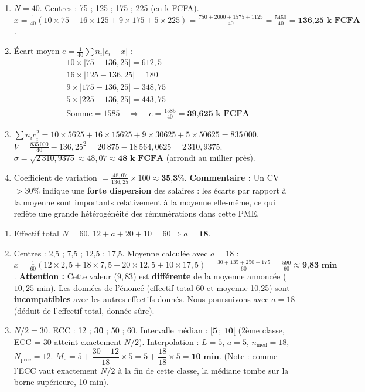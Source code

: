 \documentclass[11pt]{article}
\begin{document}
\begin{corrige}
\begin{enumerate}
\item $N=40$. Centres : 75 ; 125 ; 175 ; 225 (en k FCFA).
$\bar{x} = \frac{1}{40}(10\times75 + 16\times125 + 9\times175 + 5\times225) = \frac{750+2000+1575+1125}{40} = \frac{5450}{40} = \textbf{136,25 k FCFA}$.
\item Écart moyen $e = \frac{1}{40}\sum n_i|c_i-\bar{x}|$ :
\begin{align*}
&10\times|75-136,25| = 612,5 \\
&16\times|125-136,25| = 180 \\
&9\times|175-136,25| = 348,75 \\
&5\times|225-136,25| = 443,75 \\
&\text{Somme} = 1585 \quad\Rightarrow\quad e = \frac{1585}{40} = \textbf{39,625 k FCFA}
\end{align*}
\item $\sum n_i c_i^2 = 10\times5625 + 16\times15625 + 9\times30625 + 5\times50625 = 835\,000$.
$V = \frac{835\,000}{40} - 136,25^2 = 20\,875 - 18\,564,0625 = 2\,310,9375$.
$\sigma = \sqrt{2\,310,9375} \approx 48,07 \approx \textbf{48 k FCFA}$ (arrondi au millier près).
\item Coefficient de variation $= \frac{48,07}{136,25}\times 100 \approx \textbf{35,3\%}$.
\textbf{Commentaire :} Un CV $> 30\%$ indique une \textbf{forte dispersion} des salaires : les écarts par rapport à la moyenne sont importants relativement à la moyenne elle-même, ce qui reflète une grande hétérogénéité des rémunérations dans cette PME.
\end{enumerate}
\end{corrige}

\begin{corrige}
\begin{enumerate}
\item Effectif total $N=60$. $12 + a + 20 + 10 = 60 \Rightarrow a = \textbf{18}$.
\item Centres : 2,5 ; 7,5 ; 12,5 ; 17,5.
Moyenne calculée avec $a=18$ :
$\bar{x} = \frac{1}{60}(12\times2,5 + 18\times7,5 + 20\times12,5 + 10\times17,5) = \frac{30+135+250+175}{60} = \frac{590}{60} \approx \textbf{9,83 min}$.
\textbf{Attention :} Cette valeur ($9,83$) est \textbf{différente} de la moyenne annoncée ($10,25$ min). Les données de l'énoncé (effectif total 60 et moyenne 10,25) sont \textbf{incompatibles} avec les autres effectifs donnés. Nous poursuivons avec $a=18$ (déduit de l'effectif total, donnée sûre).
\item $N/2 = 30$. ECC : 12 ; \textbf{30} ; 50 ; 60. Intervalle médian : $\boldsymbol{[5\,;\,10[}$ (2ème classe, ECC = 30 atteint exactement $N/2$).
Interpolation : $L=5$, $a=5$, $n_{\text{med}}=18$, $N_{\text{prec}}=12$.
$M_e = 5 + \dfrac{30-12}{18}\times 5 = 5 + \dfrac{18}{18}\times 5 = \textbf{10 min}$.
(Note : comme l'ECC vaut exactement $N/2$ à la fin de cette classe, la médiane tombe sur la borne supérieure, 10 min).
\end{enumerate}
\end{corrige}
\end{document}
